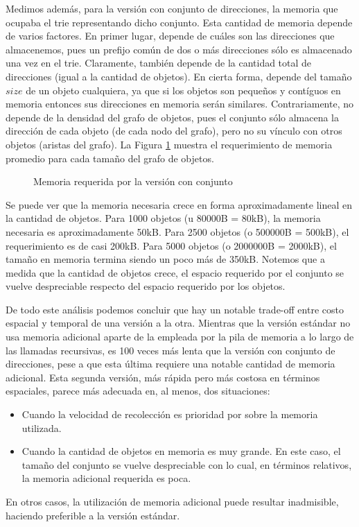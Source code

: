 Medimos además, para la versión con conjunto de direcciones, la memoria que ocupaba el trie representando dicho conjunto. Esta cantidad de memoria depende de varios factores. En primer lugar, depende de cuáles son las direcciones que almacenemos, pues un prefijo común de dos o más direcciones sólo es almacenado una vez en el trie. Claramente, también depende de la cantidad total de direcciones (igual a la cantidad de objetos). En cierta forma, depende del tamaño $size$ de un objeto cualquiera, ya que si los objetos son pequeños y contíguos en memoria entonces sus direcciones en memoria serán similares. Contrariamente, no depende de la densidad del grafo de objetos, pues el conjunto sólo almacena la dirección de cada objeto (de cada nodo del grafo), pero no su vínculo con otros objetos (aristas del grafo). La Figura \ref{fig:memoria} muestra el requerimiento de memoria promedio para cada tamaño del grafo de objetos.

\begin{figure}[H]
\centering

\caption{Memoria requerida por la versión con conjunto}
\label{fig:memoria}
\end{figure}

Se puede ver que la memoria necesaria crece en forma aproximadamente lineal en la cantidad de objetos. Para 1000 objetos (u 80000B = 80kB), la memoria necesaria es aproximadamente 50kB. Para 2500 objetos (o 500000B = 500kB), el requerimiento es de casi 200kB. Para 5000 objetos (o 2000000B = 2000kB), el tamaño en memoria termina siendo un poco más de 350kB. Notemos que a medida que la cantidad de objetos crece, el espacio requerido por el conjunto se vuelve despreciable respecto del espacio requerido por los objetos.

De todo este análisis podemos concluir que hay un notable trade-off entre costo espacial y temporal de una versión a la otra. Mientras que la versión estándar no usa memoria adicional aparte de la empleada por la pila de memoria a lo largo de las llamadas recursivas, es 100 veces más lenta que la versión con conjunto de direcciones, pese a que esta última requiere una notable cantidad de memoria adicional. Esta segunda versión, más rápida pero más costosa en términos espaciales, parece más adecuada en, al menos, dos situaciones:

\begin{itemize}
\item Cuando la velocidad de recolección es prioridad por sobre la memoria utilizada.

\item Cuando la cantidad de objetos en memoria es muy grande. En este caso, el tamaño del conjunto se vuelve despreciable con lo cual, en términos relativos, la memoria adicional requerida es poca.
\end{itemize}

En otros casos, la utilización de memoria adicional puede resultar inadmisible, haciendo preferible a la versión estándar.